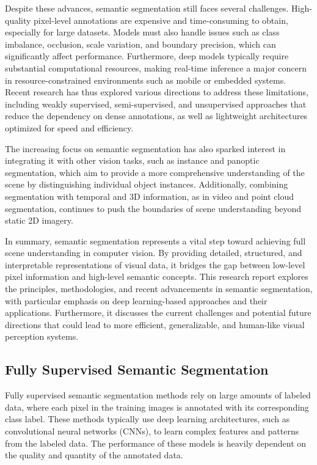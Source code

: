 Despite these advances, semantic segmentation still faces several challenges. High-quality pixel-level annotations are expensive and time-consuming to obtain, especially for large datasets. Models must also handle issues such as class imbalance, occlusion, scale variation, and boundary precision, which can significantly affect performance. Furthermore, deep models typically require substantial computational resources, making real-time inference a major concern in resource-constrained environments such as mobile or embedded systems. Recent research has thus explored various directions to address these limitations, including weakly supervised, semi-supervised, and unsupervised approaches that reduce the dependency on dense annotations, as well as lightweight architectures optimized for speed and efficiency.

The increasing focus on semantic segmentation has also sparked interest in integrating it with other vision tasks, such as instance and panoptic segmentation, which aim to provide a more comprehensive understanding of the scene by distinguishing individual object instances. Additionally, combining segmentation with temporal and 3D information, as in video and point cloud segmentation, continues to push the boundaries of scene understanding beyond static 2D imagery.

In summary, semantic segmentation represents a vital step toward achieving full scene understanding in computer vision. By providing detailed, structured, and interpretable representations of visual data, it bridges the gap between low-level pixel information and high-level semantic concepts. This research report explores the principles, methodologies, and recent advancements in semantic segmentation, with particular emphasis on deep learning-based approaches and their applications. Furthermore, it discusses the current challenges and potential future directions that could lead to more efficient, generalizable, and human-like visual perception systems.


\subsection{Fully Supervised Semantic Segmentation}
\label{subsec:fully_supervised}
Fully supervised semantic segmentation methods rely on large amounts of labeled data, where each pixel in the training images is annotated with its corresponding class label. These methods typically use deep learning architectures, such as convolutional neural networks (CNNs), to learn complex features and patterns from the labeled data. The performance of these models is heavily dependent on the quality and quantity of the annotated data.

